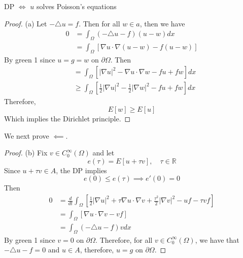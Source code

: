 \documentclass{article}
\newtheorem{one minute paper}[theorem]{One Minute Paper}
\begin{document}
\begin{center}
    DP $\iff$ $u$ solves Poisson's equations
\end{center}

\begin{proof}
    (a) Let $-\triangle u = f$. Then for all $w \in a$, then we have 
    \begin{align}
        0 &= \int_{\Omega}\left( -\triangle u - f \right)\left( u - w \right)dx \\
        &= \int_{\Omega}\left[ \nabla u \cdot \nabla (u - w) - f(u - w) \right]
    \end{align}
    By green 1 since $ u = g = w$ on $\partial \Omega$. Then 
    \begin{align}
        &= \int_{\Omega}\left[ |\nabla u|^2 - \nabla u \cdot \nabla w - fu + fw \right]dx \\
        &\geq \int_{\Omega}\left[ \frac{1}{2}|\nabla u|^2 - \frac{1}{2}|\nabla w|^2 - fu + fw \right]dx
    \end{align}
    Therefore, 
    \begin{equation}
        E[w] \geq E[u]
    \end{equation}
    Which implies the Dirichlet principle. 
\end{proof}

We next prove $\impliedby$. 

\begin{proof}
    (b) Fix $v \in C^{\infty}_0(\Omega)$ and let 
    \begin{equation}
        e(\tau) = E[u + \tau v], \quad \tau \in \mathbb{R}
    \end{equation} 
    Since $u + \tau v \in A$, the DP implies 
    \begin{equation}
        e(0) \leq e(\tau) \implies e'(0) = 0
    \end{equation}
    Then 
    \begin{align}
        0 &= \frac{d}{dt}\int_{\Omega}\left[ \frac{1}{2}|\nabla u|^2 + \tau \nabla u \cdot \nabla v + \frac{\tau^2}{2}|\nabla v|^2 - uf - \tau v f\right] \\
        &= \int_{\Omega}\left[ \nabla u \cdot \nabla v - vf \right] \\
        &= \int_{\Omega}\left( -\triangle u - f \right)v dx
    \end{align}
    By green 1 since $v = 0$ on $\partial \Omega$. Therefore, for all $v \in C^{\infty}_0(\Omega)$, we have that $-\triangle u - f = 0$ and $u \in A$, therefore, $u = g$ on $\partial \Omega$. 
\end{proof}
\end{document}
